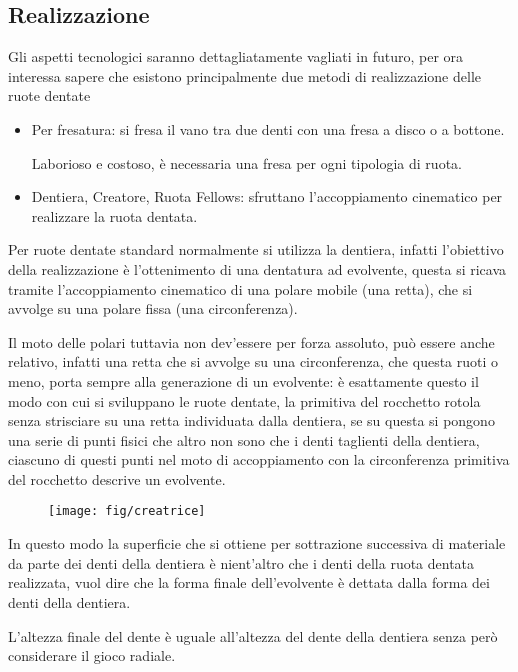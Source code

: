 \documentclass[a4paper, 15pt]{article}
\begin{document}
\subsection{Realizzazione}
\begin{adjustwidth}{2in}{}		
		Gli aspetti tecnologici saranno dettagliatamente vagliati in futuro, per ora interessa sapere che esistono principalmente due metodi di realizzazione delle ruote dentate
		\begin{itemize}
			\item Per fresatura: si fresa il vano tra due denti con una fresa a disco o a bottone. 
			
			Laborioso e costoso, è necessaria una fresa per ogni tipologia di ruota.
			
			\item Dentiera, Creatore, Ruota Fellows: sfruttano l'accoppiamento cinematico per realizzare la ruota dentata.
		\end{itemize} 
		Per ruote dentate standard normalmente si utilizza la dentiera, infatti l'obiettivo della realizzazione è l'ottenimento di una dentatura ad evolvente, questa si ricava tramite l'accoppiamento cinematico di una polare mobile (una retta), che si avvolge su una polare fissa (una circonferenza). \newline 
		
		Il moto delle polari tuttavia non dev'essere per forza assoluto, può essere anche relativo, infatti una retta che si avvolge su una circonferenza, che questa ruoti o meno, porta sempre alla generazione di un evolvente: è esattamente questo il modo con cui si sviluppano le ruote dentate, la primitiva del rocchetto rotola senza strisciare su una retta individuata dalla dentiera, se su questa si pongono una serie di punti fisici che altro non sono che i denti taglienti della dentiera, ciascuno di questi punti nel moto di accoppiamento con la circonferenza primitiva del rocchetto descrive un evolvente.
\newpage
		\begin{figure}[H]
			\centering
			\texttt{[image: fig/creatrice]}
			\label{fig:creatrice}
		\end{figure}
		In questo modo la superficie che si ottiene per sottrazione successiva di materiale da parte dei denti della dentiera è nient'altro che i denti della ruota dentata realizzata, vuol dire che la forma finale dell'evolvente è dettata dalla forma dei denti della dentiera. \newline
		
		L'altezza finale del dente è uguale all'altezza del dente della dentiera senza però considerare il gioco radiale.
		

\end{adjustwidth}
\end{document}
